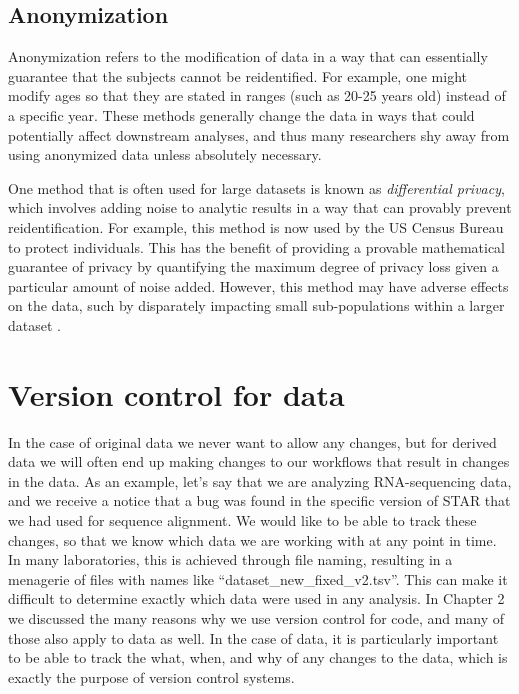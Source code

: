 \subsection{Anonymization}

Anonymization refers to the modification of data in a way that can essentially guarantee that the subjects cannot be reidentified. For example, one might modify ages so that they are stated in ranges (such as 20-25 years old) instead of a specific year.  These methods generally change the data in ways that could potentially affect downstream analyses, and thus many researchers shy away from using anonymized data unless absolutely necessary.

One method that is often used for large datasets is known as \textit{differential privacy}, which involves adding noise to analytic results in a way that can provably prevent reidentification.  For example, this method is now used by the US Census Bureau to protect individuals. This has the benefit of providing a provable mathematical guarantee of privacy by quantifying the maximum degree of privacy loss given a particular amount of noise added.  However, this method may have adverse effects on the data, such by disparately impacting small sub-populations within a larger dataset \citep{Santos-Lozada:2020aa}.

\section{Version control for data}

In the case of original data we never want to allow any changes, but for derived data we will often end up making changes to our workflows that result in changes in the data.  As an example, let's say that we are analyzing RNA-sequencing data, and we receive a notice that a bug was found in the specific version of STAR that we had used for sequence alignment.  We would like to be able to track these changes, so that we know which data we are working with at any point in time. In many laboratories, this is achieved through file naming, resulting in a menagerie of files with names like ``dataset\_new\_fixed\_v2.tsv''.  This can make it difficult to determine exactly which data were used in any analysis. In Chapter 2 we discussed the many reasons why we use version control for code, and many of those also apply to data as well. In the case of data, it is particularly important to be able to track the what, when, and why of any changes to the data, which is exactly the purpose of version control systems.

